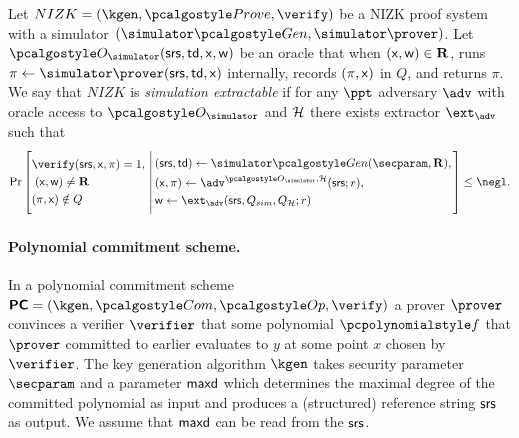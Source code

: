 \documentclass[runningheads,11pt]{llncs}
\begin{document}
\begin{definition}
  \label{def:sepcom}
  Let $NIZK = (\kgen, \prove, \verify)$ be a NIZK proof system
  with a simulator $(\simgen, \simprove)$.
  Let $\oracles(\srs, \td, \inp, \wit)$ be an oracle that when $(\mathsf{x}, \mathsf{w})\in
  \mathbf{R}$, runs $\pi \gets \simprove(\srs, \td, \inp)$ internally, records $(\pi,\mathsf{x})$ in $Q$, and returns $\pi$.
  We say that $NIZK$ is \emph{simulation extractable} if for any $\ppt$
  adversary $\adv$ with oracle access to $\oracles$ and $\mathcal{H}$ there exists extractor
  $\ext_{\adv}$ such that
\[
  \Pr \left[
    \begin{aligned}
      & \verify(\srs, \inp, \pi) = 1, \\
      & \;(\inp, \wit) \neq \REL\\
      & (\pi,\inp) \notin Q
    \end{aligned}
    \,\left|\,
      \vphantom{
        \begin{aligned}
          & \\
          & \\
          & \\
          &
        \end{aligned}
        }
    \begin{aligned}
      & (\srs, \td) \gets \simgen(\secparam, \REL),\\
      & (\inp, \pi) \gets \adv^{\oracles,\ro}(\srs; r), \\
      & \wit \gets \ext_\adv(\srs, Q_{sim}, Q_{\ro}; r)
    \end{aligned}
  \right.\right]
  \leq \negl.
\]
\end{definition}

\paragraph{Polynomial commitment scheme.}
\label{sec:poly_com}
In a polynomial commitment scheme $\PCOM = (\kgen, \com, \open, \verify)$ a
prover $\prover$ convinces a verifier $\verifier$ that some polynomial $\p{f}$
that $\prover$ committed to earlier evaluates to $y$ at some point $x$ chosen by
$\verifier$. The key generation algorithm $\kgen$ takes security
parameter $\secparam$ and a parameter $\mathsf{maxd}$ which determines the maximal
degree of the committed polynomial as input and produces a (structured) reference string $\mathsf{srs}$ as output. We assume that $\mathsf{maxd}$ can be read from
the $\mathsf{srs}$.
  
\end{document}
